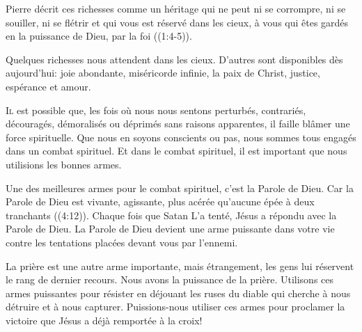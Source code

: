 Pierre décrit ces richesses comme \Og un héritage qui ne peut ni se corrompre,
 ni se souiller, ni se flétrir et qui vous est réservé dans les cieux,
 à vous qui êtes gardés en la puissance de Dieu, par la foi \Fg{}
 ((1:4-5)). 

Quelques richesses nous attendent dans les cieux.
 D'autres sont disponibles dès aujourd'hui:
 joie abondante, miséricorde infinie, la paix de Christ,
 justice, espérance et amour.

\dvrule







\lettrine{I}{l} est possible que,
 les fois où nous nous sentons perturbés, contrariés, découragés,
 démoralisés ou déprimés sans raisons apparentes, il faille blâmer
 une force spirituelle.
 Que nous en soyons conscients ou pas, nous sommes tous engagés
 dans un combat spirituel. Et dans le combat spirituel,
 il est important que nous utilisions les bonnes armes.

Une des meilleures armes pour le combat spirituel, c'est la Parole de Dieu.
 \Og Car la Parole de Dieu est vivante, agissante, plus acérée
 qu'aucune épée à deux tranchants \Fg{} ((4:12)).
 Chaque fois que Satan L'a tenté, Jésus a répondu avec la Parole de Dieu.
 La Parole de Dieu devient une arme puissante dans votre vie
 contre les tentations placées devant vous par l'ennemi.


La prière est une autre arme importante, mais étrangement,
 les gens lui réservent le rang de dernier recours.
 Nous avons la puissance de la prière. Utilisons ces armes puissantes
 pour résister en déjouant les ruses du diable qui cherche à nous détruire
 et à nous capturer.
 Puissions-nous utiliser ces armes pour proclamer la victoire
 que Jésus a déjà remportée à la croix!

